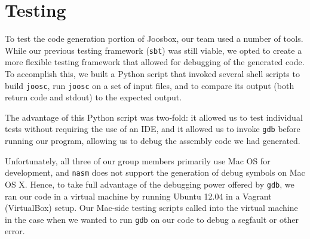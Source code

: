 \documentclass[letterpaper]{article}
\begin{document}
  \section{Testing}

  To test the code generation portion of Joosbox, our team used a number of
  tools. While our previous testing framework ({\tt sbt}) was still viable, we
  opted to create a more flexible testing framework that allowed for debugging
  of the generated code. To accomplish this, we built a Python script that
  invoked several shell scripts to build {\tt joosc}, run {\tt joosc} on a set
  of input files, and to compare its output (both return code and stdout) to
  the expected output.

  The advantage of this Python script was two-fold: it allowed us to test
  individual tests without requiring the use of an IDE, and it allowed us to
  invoke {\tt gdb} before running our program, allowing us to debug the
  assembly code we had generated.

  Unfortunately, all three of our group members primarily use Mac OS for
  development, and {\tt nasm} does not support the generation of debug symbols
  on Mac OS X. Hence, to take full advantage of the debugging power offered by
  {\tt gdb}, we ran our code in a virtual machine by running Ubuntu 12.04 in a
  Vagrant (VirtualBox) setup. Our Mac-side testing scripts called into the
  virtual machine in the case when we wanted to run {\tt gdb} on our code to
  debug a segfault or other error.
\end{document}
